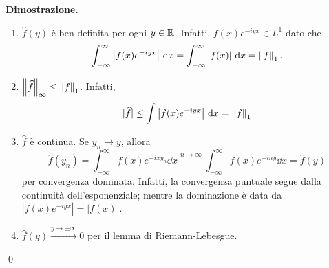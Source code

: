 \textbf{Dimostrazione.} 
\begin{enumerate}

	\item $\hat{f}(y)$ è ben definita per ogni $y \in \mathbb R$. Infatti, $f(x) e^{-iyx} \in L^1$ dato che
	$$
		\int_{-\infty}^\infty \left| f(x) e^{-iyx} \right| \,\mathrm{d} x 
		= \int_{-\infty}^\infty \left| f(x) \right| \,\mathrm{d} x
		= \left\lVert f \right\rVert_1.
	$$


	\item $\left\lVert \widehat{f} \right\rVert_\infty \leq \left\lVert f \right\rVert_1$. Infatti,
	$$
		|\widehat{f}| \leq \int \left| f(x) e^{-iyx} \right| \,\mathrm{d} x = \left\lVert f \right\rVert_1
	$$


	\item $\hat{f}$ è continua. Se $y_n \to y$, allora
	$$
		\hat{f}(y_n) = \int_{-\infty}^\infty f(x) e^{-ixy_n} \dd x \xrightarrow{n \to \infty}
		\int_{-\infty}^\infty f(x) e^{-iny} \dd x = \hat{f}(y)
	$$
	per convergenza dominata. Infatti, la convergenza puntuale segue dalla continuità dell'esponenziale; mentre la dominazione è data da $|f(x) e^{-iyx}| = |f(x)|$.


	\item $\hat{f}(y) \xrightarrow{y \to \pm \infty} 0$ per il lemma di Riemann-Lebesgue.

\end{enumerate}
\qed

